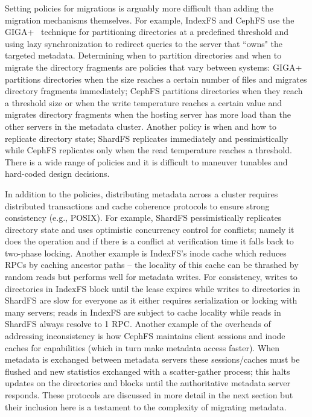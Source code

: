 Setting policies for migrations is arguably more difficult than adding the
migration mechanisms themselves.  For example, IndexFS and CephFS use the
GIGA+~\cite{patil:fast2011-giga} technique for partitioning directories at a predefined
threshold and using lazy synchronization to redirect queries to the server that
``owns" the targeted metadata.  Determining when to partition directories and
when to migrate the directory fragments are policies that vary between systems:
GIGA+ partitions directories when the size reaches a certain number of files
and migrates directory fragments immediately; CephFS partitions directories
when they reach a threshold size or when the write temperature reaches a
certain value and migrates directory fragments when the hosting server has more
load than the other servers in the metadata cluster. Another policy is when and
how to replicate directory state; ShardFS replicates immediately and
pessimistically while CephFS replicates only when the read temperature reaches
a threshold.  There is a wide range of policies and it is difficult to maneuver
tunables and hard-coded design decisions.

In addition to the policies, distributing metadata across a cluster requires
distributed transactions and cache coherence protocols to ensure strong
consistency ({e.g.}, POSIX).  For example, ShardFS pessimistically replicates
directory state and uses optimistic concurrency control for conflicts; namely
it does the operation and if there is a conflict at verification time it falls
back to two-phase locking.  Another example is IndexFS's inode cache which
reduces RPCs by caching ancestor paths -- the locality of this cache can be
thrashed by random reads but performs well for metadata writes. For
consistency, writes to directories in IndexFS block until the lease expires
while writes to directories in ShardFS are slow for everyone as it either
requires serialization or locking with many servers; reads in IndexFS are
subject to cache locality while reads in ShardFS always resolve to 1 RPC.
Another example of the overheads of addressing inconsistency is how CephFS
maintains client sessions and inode caches for capabilities (which in turn make
metadata access faster). When metadata is exchanged between metadata servers
these sessions/caches must be flushed and new statistics exchanged with a
scatter-gather process; this halts updates on the directories and blocks until
the authoritative metadata server responds.  These protocols are discussed in
more detail in the next section but their inclusion here is a testament to the
complexity of migrating metadata.


